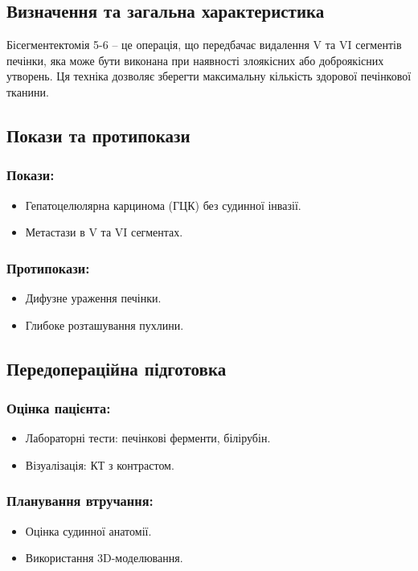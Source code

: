\begin{refsection}
\subsection{Визначення та загальна характеристика}
Бісегментектомія 5-6 – це операція, що передбачає видалення V та VI сегментів печінки, яка може бути виконана при наявності злоякісних або доброякісних утворень. Ця техніка дозволяє зберегти максимальну кількість здорової печінкової тканини.

\subsection{Покази та протипокази}
\subsubsection{Покази:}
\begin{itemize}
    \item Гепатоцелюлярна карцинома (ГЦК) без судинної інвазії.
    \item Метастази в V та VI сегментах.
\end{itemize}

\subsubsection{Протипокази:}
\begin{itemize}
    \item Дифузне ураження печінки.
    \item Глибоке розташування пухлини.
\end{itemize}

\subsection{Передопераційна підготовка}
\subsubsection{Оцінка пацієнта:}
\begin{itemize}
    \item Лабораторні тести: печінкові ферменти, білірубін.
    \item Візуалізація: КТ з контрастом.
\end{itemize}

\subsubsection{Планування втручання:}
\begin{itemize}
    \item Оцінка судинної анатомії.
    \item Використання 3D-моделювання.
\end{itemize}


\end{refsection}
